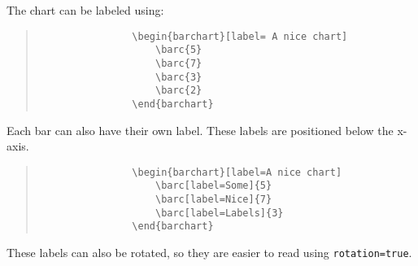 \documentclass[]{article}
\begin{document}
The chart can be labeled using:


\begin{center}
	\begin{minipage}[l][][c]{0.45\linewidth} 
		\begin{quote}\small
			\begin{verbatim}
				\begin{barchart}[label= A nice chart]
				    \barc{5}
				    \barc{7}
				    \barc{3}
				    \barc{2}
				\end{barchart}
			\end{verbatim}
		\end{quote}
	\end{minipage}
	\quad
	\begin{minipage}[r][][c]{0.45\linewidth}
		\begin{barchart}[label= A nice chart]
		\end{barchart}
	\end{minipage}
\end{center}

Each bar can also have their own label. These labels are positioned below the x-axis. 

\begin{center}
	\begin{minipage}[l][][c]{0.45\linewidth} 
		\begin{quote}\small
			\begin{verbatim}
				\begin{barchart}[label=A nice chart]
				    \barc[label=Some]{5}
				    \barc[label=Nice]{7}
				    \barc[label=Labels]{3}
				\end{barchart}
			\end{verbatim}
		\end{quote}
	\end{minipage}
	\quad
	\begin{minipage}[r][][c]{0.45\linewidth}
		\begin{barchart}[label=A nice chart]
		\end{barchart}
	\end{minipage}
\end{center}

These labels can also be rotated, so they are easier to read using \texttt{rotation=true}. 
\end{document}
